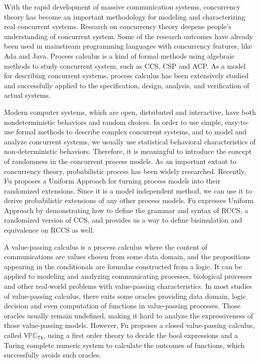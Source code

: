 
\begin{digest}
  With the rapid development of massive communication systems, concurrency theory has become an important methodology for modeling and characterizing real concurrent systems. Research on concurrency theory deepens people's understanding of concurrent system. Some of the research outcomes have already been used in mainstream programming languages with concurrency features, like Ada and Java. Process calculus is a kind of formal methods using algebraic methods to study concurrent system, such as CCS, CSP and ACP. As a model for describing concurrent systems, process calculus has been extensively studied and successfully applied to the specification, design, analysis, and verification of actual systems.

  Modern computer systems, which are open, distributed and interactive, have both nondeterministic behaviors and random choices. In order to use simple, easy-to-use formal methods to describe complex concurrent systems, and to model and analyze concurrent systems, we usually use statistical behavioral characteristics of non-deterministic behaviors. Therefore, it is meaningful to introduce the concept of randomness in the concurrent process models. As an important extant to concurrency theory, probabilistic process has been widely researched. Recently, Fu proposes a Uniform Approach for turning process models into their randomized extensions. Since it is a model independent method, we can use it to derive probabilistic extensions of any other process models. Fu expresses Uniform Approach by demonstrating how to define the grammar and syntax of RCCS, a randomized version of CCS, and provides us a way to define bisimulation and equivalence on RCCS as well.

  A value-passing calculus is a process calculus where the content of communications are values chosen from some data domain, and the propositions appearing in the conditionals are formulas constructed from a logic. It can be applied to modeling and analyzing communicating processes, biological processes and other real-world problems with value-passing characteristics. In most studies of value-passing calculus, there exits some oracles providing data domain, logic decision and even computation of functions in value-passing processes. Those oracles usually remain undefined, making it hard to analyze the expressiveness of those value-passing models. However, Fu proposes a closed value-passing calculus, called $\mathbb{VPC}_{\mathsf{Th}}$, using a first order theory to decide the bool expressions and a Turing complete numeric system to calculate the outcomes of functions, which successfully avoids such oracles. 
  

\end{digest}
